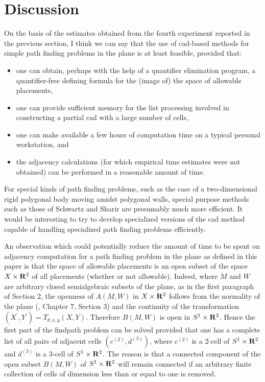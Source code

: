 \section{Discussion}
On the basis of the estimates obtained from the fourth
experiment reported in the previous section,
I think we can say that the use of cad-based methods for
simple path finding problems in the plane is at least
feasible, provided that:
\begin{itemize}
\item  one can obtain, perhaps with the help of
a quantifier elimination program, a quantifier-free
defining formula for the (image of) the space of allowable
placements, 
\item one can provide sufficient memory for the list processing
involved in constructing a partial cad with a large number of cells,
\item one can make available a few hours of computation time
on a typical personal workstation, and
\item the adjacency calculations (for which empirical time estimates were not
obtained) can be performed in a reasonable amount of time.
\end{itemize}
For special kinds of path finding problems, such as the case
of a two-dimensional rigid polygonal body moving amidst polygonal
walls, special purpose methods such as those of Schwartz and Sharir
\cite{Schwartz_Sharir:83a} are presumably much more efficient.
It would be interesting to try to develop specialized versions of the
cad method capable of handling specialized path finding problems efficiently.

An observation which could potentially reduce the amount of time
to be spent on adjacency computation for a path finding problem
in the plane as defined in this paper is that the space of
allowable placements is an open subset of the space
$X \times {\bf R}^{2}$ of all placements (whether or not allowable).
Indeed, where $M$ and $W$ are arbitrary closed semialgebraic
subsets of the plane, as in the first paragraph of Section 2,
the openness of $A(M,W)$ in $X \times {\bf R}^{2}$ follows from
the normality of the plane (\cite{Dugundji:66}, Chapter 7, Section 3)
and the continuity of the transformation
$(X^{\prime}, Y^{\prime}) = T_{\theta ,x,y}(X,Y)$.
Therefore $B(M,W)$ is open in $S^{1} \times {\bf R}^{2}$.
Hence the first part of the findpath problem can be solved provided
that one has a complete list of all pairs of adjacent cells
$(c^{(2)},d^{(3)})$, where $c^{(2)}$ is a 2-cell of $S^{1} \times {\bf R}^2$
and $d^{(3)}$ is a 3-cell of $S^{1} \times {\bf R}^{2}$.
The reason is that a connected component of the open subset $B(M,W)$ 
of $S^{1} \times {\bf R}^{2}$ will remain
connected if an arbitrary finite collection of cells of dimension
less than or equal to one is removed.



